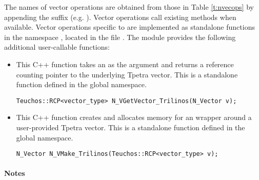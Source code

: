 The names of vector operations are obtained from those in
Table \ref{t:nvecops} by appending the suffix  (e.g. ).
Vector operations call existing  methods when available. Vector
operations specific to {\sundials} are implemented as standalone functions in the namespace
, located in the file .
The module {\nvectrilinos} provides the following additional user-callable functions:
\begin{itemize}



\item {}

  This C++ function takes an  as the argument and returns a reference
  counting pointer to the underlying Tpetra vector. This is a standalone function
  defined in the global namespace.

\begin{verbatim}
Teuchos::RCP<vector_type> N_VGetVector_Trilinos(N_Vector v);
\end{verbatim}



\item {}

  This C++ function creates and allocates memory for an {\nvectrilinos}
  wrapper around a user-provided Tpetra vector. This is a standalone function
  defined in the global namespace.

\begin{verbatim}
N_Vector N_VMake_Trilinos(Teuchos::RCP<vector_type> v);
\end{verbatim}


\end{itemize}
\paragraph{\bf Notes}

